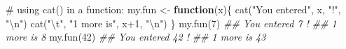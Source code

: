 \documentclass[
  13,
  letterpaper,
]{report}
\newenvironment{Shaded}{\begin{snugshade}}{\end{snugshade}}
\newcommand{\CommentTok}[1]{\textcolor[rgb]{0.37,0.37,0.37}{#1}}
\newcommand{\ControlFlowTok}[1]{\textcolor[rgb]{0.00,0.23,0.31}{\textbf{#1}}}
\newcommand{\DecValTok}[1]{\textcolor[rgb]{0.68,0.00,0.00}{#1}}
\newcommand{\DocumentationTok}[1]{\textcolor[rgb]{0.37,0.37,0.37}{\textit{#1}}}
\newcommand{\FunctionTok}[1]{\textcolor[rgb]{0.28,0.35,0.67}{#1}}
\newcommand{\NormalTok}[1]{\textcolor[rgb]{0.00,0.23,0.31}{#1}}
\newcommand{\OtherTok}[1]{\textcolor[rgb]{0.00,0.23,0.31}{#1}}
\newcommand{\SpecialCharTok}[1]{\textcolor[rgb]{0.37,0.37,0.37}{#1}}
\newcommand{\StringTok}[1]{\textcolor[rgb]{0.13,0.47,0.30}{#1}}
\begin{document}
\begin{Shaded}
\begin{Highlighting}[]

\CommentTok{\# using cat() in a function:}
\NormalTok{my.fun }\OtherTok{\textless{}{-}} \ControlFlowTok{function}\NormalTok{(x)\{}
    \FunctionTok{cat}\NormalTok{(}\StringTok{"You entered"}\NormalTok{, x, }\StringTok{"!"}\NormalTok{, }\StringTok{"}\SpecialCharTok{\textbackslash{}n}\StringTok{"}\NormalTok{)}
    \FunctionTok{cat}\NormalTok{(}\StringTok{"}\SpecialCharTok{\textbackslash{}t}\StringTok{"}\NormalTok{, }\StringTok{"1 more is"}\NormalTok{, x}\SpecialCharTok{+}\DecValTok{1}\NormalTok{, }\StringTok{"}\SpecialCharTok{\textbackslash{}n}\StringTok{"}\NormalTok{)}
\NormalTok{\}}
\FunctionTok{my.fun}\NormalTok{(}\DecValTok{7}\NormalTok{)}
\DocumentationTok{\#\# You entered 7 ! }
\DocumentationTok{\#\#   1 more is 8}
\FunctionTok{my.fun}\NormalTok{(}\DecValTok{42}\NormalTok{)}
\DocumentationTok{\#\# You entered 42 ! }
\DocumentationTok{\#\#   1 more is 43}


\end{Highlighting}
\end{Shaded}
\end{document}
